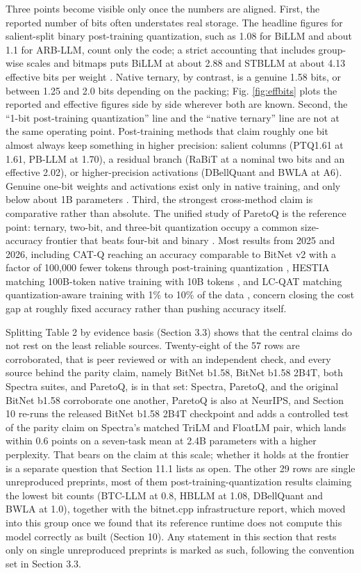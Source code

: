 \documentclass[11pt]{article}
\begin{document}
Three points become visible only once the numbers are aligned. First, the reported
number of bits often understates real storage. The headline figures for salient-split
binary post-training quantization, such as 1.08 for BiLLM and about 1.1 for ARB-LLM,
count only the code; a strict accounting that includes group-wise scales and bitmaps
puts BiLLM at about 2.88 and STBLLM at about 4.13 effective bits per weight
\cite{Chong2026-NanoQuant}. Native ternary, by contrast, is a genuine 1.58 bits, or between
1.25 and 2.0 bits depending on the packing; Fig. \ref{fig:effbits} plots the reported and
effective figures side by side wherever both are known. Second, the ``1-bit post-training quantization''
line and the ``native ternary'' line are not at the same operating point.
Post-training methods that claim roughly one bit almost always keep something in higher
precision: salient columns (PTQ1.61 at 1.61, PB-LLM at 1.70), a residual branch (RaBiT
at a nominal two bits and an effective 2.02), or higher-precision activations
(DBellQuant and BWLA at A6). Genuine one-bit weights and activations exist only in
native training, and only below about 1B parameters \cite{Panferov2025-QuEST}. Third, the
strongest cross-method claim is comparative rather than absolute. The unified study of
ParetoQ is the reference point: ternary, two-bit, and three-bit quantization occupy a
common size-accuracy frontier that beats four-bit and binary \cite{Liu2025-ParetoQ}. Most
results from 2025 and 2026, including CAT-Q reaching an accuracy comparable to BitNet v2
with a factor of 100,000 fewer tokens through post-training quantization
\cite{Wang2026-CATQ}, HESTIA matching 100B-token native training with 10B tokens
\cite{Wang2026-HESTIA}, and LC-QAT matching quantization-aware training with 1\% to 10\% of
the data \cite{Wang2026-LCQAT}, concern closing the cost gap at roughly fixed accuracy rather
than pushing accuracy itself.

Splitting Table 2 by evidence basis (Section 3.3) shows that the central claims do not
rest on the least reliable sources. Twenty-eight of the 57 rows are corroborated, that
is peer reviewed or with an independent check, and every source behind the parity claim,
namely BitNet b1.58, BitNet b1.58 2B4T, both Spectra suites, and ParetoQ, is in that
set: Spectra, ParetoQ, and the original BitNet b1.58 corroborate one another, ParetoQ is
also at NeurIPS, and Section 10 re-runs the released BitNet b1.58 2B4T checkpoint and
adds a controlled test of the parity claim on Spectra's matched TriLM and FloatLM pair,
which lands within 0.6 points on a seven-task mean at 2.4B parameters with a higher
perplexity. That bears on the claim at this scale; whether it holds at the frontier is a
separate question that Section 11.1 lists as open. The other 29 rows are single unreproduced preprints, most of
them post-training-quantization results claiming the lowest bit counts (BTC-LLM at 0.8,
HBLLM at 1.08, DBellQuant and BWLA at 1.0), together with the bitnet.cpp infrastructure
report, which moved into this group once we found that its reference runtime does not
compute this model correctly as built (Section 10). Any statement in this section that
rests only on single unreproduced preprints is marked as such, following the convention
set in Section 3.3.
\end{document}
